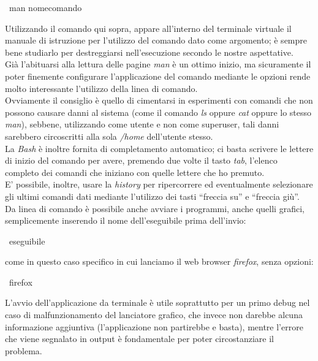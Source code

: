 \begin{shaded}
{\color[cmyk]{0, 0, 0, 0}\textdollar\ man nomecomando}
\end{shaded}
Utilizzando il comando qui sopra, appare all'interno del terminale virtuale il manuale di istruzione per l'utilizzo del comando dato come argomento; è sempre bene studiarlo per destreggiarsi nell'esecuzione secondo le nostre aspettative.\\

Già l'abituarsi alla lettura delle pagine {\itshape man} è un ottimo inizio, ma sicuramente il poter finemente configurare l'applicazione del comando mediante le opzioni rende molto interessante l'utilizzo della linea di comando.\\

Ovviamente il consiglio è quello di cimentarsi in esperimenti con comandi che non possono causare danni al sistema (come il comando {\itshape ls} oppure {\itshape cat} oppure lo stesso {\itshape man}), sebbene, utilizzando come utente e non come superuser, tali danni sarebbero circoscritti alla sola {\itshape /home} dell'utente stesso.\\

La {\itshape Bash} è inoltre fornita di completamento automatico; ci basta scrivere le lettere di inizio del comando per avere, premendo due volte il tasto {\itshape tab}, l'elenco completo dei comandi che iniziano con quelle lettere che ho premuto.\\
E' possibile, inoltre, usare la {\itshape history} per ripercorrere ed eventualmente selezionare gli ultimi comandi dati mediante l'utilizzo dei tasti ``freccia su'' e ``freccia giù''.\\

Da linea di comando è possibile anche avviare i programmi, anche quelli grafici, semplicemente inserendo il nome dell'eseguibile prima dell'invio:

\begin{shaded}
{\color[cmyk]{0, 0, 0, 0}\textdollar\ eseguibile}
\end{shaded}

come in questo caso specifico in cui lanciamo il web browser {\itshape firefox}, senza opzioni:

\begin{shaded}
{\color[cmyk]{0, 0, 0, 0}\textdollar\ firefox}
\end{shaded}

L'avvio dell'applicazione da terminale è utile soprattutto per un primo debug nel caso di malfunzionamento del lanciatore grafico, che invece non darebbe alcuna informazione aggiuntiva (l'applicazione non partirebbe e basta), mentre l'errore che viene segnalato in output è fondamentale per poter circostanziare il problema.\\

